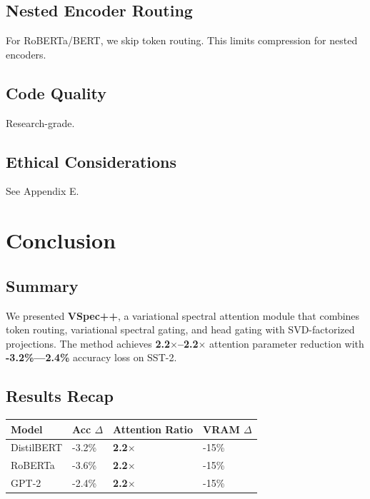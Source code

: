 \subsection{Nested Encoder Routing}

For RoBERTa/BERT, we skip token routing. This limits compression for 
nested encoders.

\subsection{Code Quality}

Research-grade.

\subsection{Ethical Considerations}

See Appendix E.



\section{Conclusion}

\subsection{Summary}

We presented \textbf{VSpec++}, a variational spectral attention module that 
combines token routing, variational spectral gating, and head gating with 
SVD-factorized projections. The method achieves \textbf{2.2$\times$--2.2$\times$} 
attention parameter reduction with \textbf{-3.2\%---2.4\%} accuracy 
loss on SST-2.

\subsection{Results Recap}

\begin{table}[H]
\centering
\small
\begin{tabular}{llll}
\toprule
\textbf{Model} & \textbf{Acc $\Delta$} & \textbf{Attention Ratio} & \textbf{VRAM $\Delta$} \\
\midrule
DistilBERT & -3.2\% & \textbf{2.2$\times$} & -15\% \\
RoBERTa & -3.6\% & \textbf{2.2$\times$} & -15\% \\
GPT-2 & -2.4\% & \textbf{2.2$\times$} & -15\% \\
\bottomrule
\end{tabular}
\end{table}

